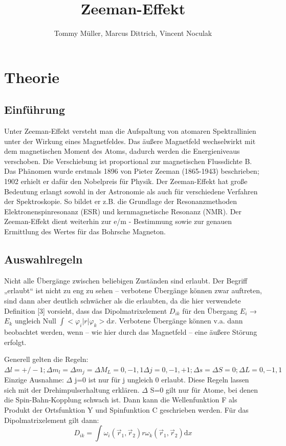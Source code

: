 \documentclass[10pt,a4paper]{article}
\author{Tommy Müller, Marcus Dittrich, Vincent Noculak}
\title{Zeeman-Effekt}
\begin{document}
\maketitle
\newpage
\tableofcontents
\newpage

\section{Theorie}

\subsection{ Einführung}


Unter Zeeman-Effekt versteht man die Aufspaltung von atomaren Spektrallinien unter der Wirkung eines Magnetfeldes. Das äußere Magnetfeld wechselwirkt mit dem magnetischen Moment des Atoms, dadurch werden die Energieniveaus verschoben. Die Verschiebung ist proportional zur magnetischen Flussdichte B. Das Phänomen wurde erstmals 1896 von Pieter Zeeman (1865-1943) beschrieben; 1902 erhielt er dafür den Nobelpreis für Physik. Der Zeeman-Effekt hat große Bedeutung erlangt sowohl in der Astronomie als auch für verschiedene Verfahren der Spektroskopie. So bildet er z.B. die Grundlage der Resonanzmethoden Elektronenspinresonanz (ESR) und kernmagnetische Resonanz (NMR). Der Zeeman-Effekt dient weiterhin zur e/m - Bestimmung sowie zur genauen Ermittlung des Wertes für das Bohrsche Magneton.


\subsection{Auswahlregeln}


Nicht alle Übergänge zwischen beliebigen Zuständen sind erlaubt. Der Begriff „erlaubt“ ist nicht zu eng zu sehen – verbotene Übergänge können zwar auftreten, sind dann aber deutlich schwächer als die erlaubten, da die hier verwendete Definition [3] vorsieht, dass das Dipolmatrixelement $D_{ik}$  für den Übergang $E_{i}$ → $E_{k}$ ungleich Null $\int <\varphi_{i} |r| \varphi_{k}>\mathrm{d}x$. Verbotene Übergänge können v.a. dann beobachtet werden, wenn – wie hier durch das Magnetfeld – eine äußere Störung erfolgt.   


Generell gelten die Regeln: $ \Delta l=+/-1 ;\Delta m_{l}=\Delta m_{j}= \Delta M_L=0 ,-1,1 \Delta j=0,-1,+1;\Delta s=\Delta S=0;\Delta L=0,-1,1$ Einzige Ausnahme: $\Delta$ j=0 ist nur für j ungleich 0 erlaubt. Diese Regeln lassen sich mit der Drehimpulserhaltung erklären. $\Delta$ S=0 gilt nur für Atome, bei denen die Spin-Bahn-Kopplung schwach ist. Dann kann die Wellenfunktion F  als Produkt der Ortsfunktion Y und Spinfunktion C geschrieben werden. Für das Dipolmatrixelement gilt dann: 
\begin{equation}
	D_{ik}= \int\omega_{i}(\overrightarrow{r}_{1},\overrightarrow{r}_{2})r\omega_{k}(\overrightarrow{r}_{1},\overrightarrow{r}_{2})\mathrm{d}x
\end{equation}
\end{document}
